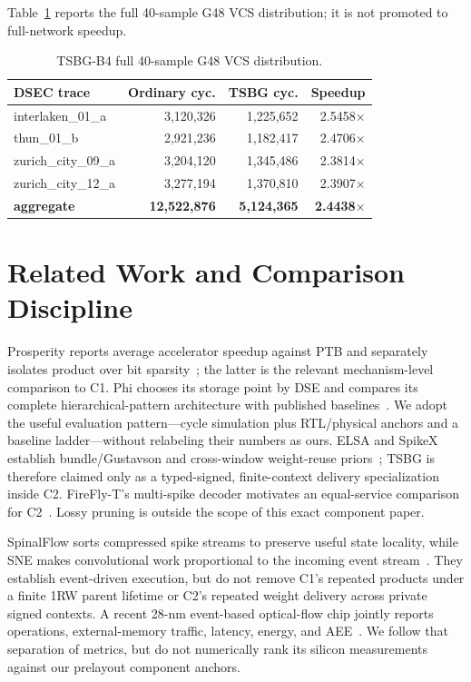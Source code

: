 \documentclass[conference]{IEEEtran}
\begin{document}
Table~\ref{tab:tsbgseq} reports the full 40-sample G48 VCS distribution; it is
not promoted to full-network speedup.

\begin{table}[t]
\caption{TSBG-B4 full 40-sample G48 VCS distribution.}
\label{tab:tsbgseq}
\centering
\scriptsize
\begin{tabular}{@{}lrrr@{}}
\toprule
DSEC trace & Ordinary cyc. & TSBG cyc. & Speedup \\
\midrule
interlaken\_01\_a & 3,120,326 & 1,225,652 & 2.5458$\times$ \\
thun\_01\_b & 2,921,236 & 1,182,417 & 2.4706$\times$ \\
zurich\_city\_09\_a & 3,204,120 & 1,345,486 & 2.3814$\times$ \\
zurich\_city\_12\_a & 3,277,194 & 1,370,810 & 2.3907$\times$ \\
\textbf{aggregate} & \textbf{12,522,876} & \textbf{5,124,365} & \textbf{2.4438$\times$} \\
\bottomrule
\end{tabular}
\end{table}

\section{Related Work and Comparison Discipline}
Prosperity reports average accelerator speedup against PTB and separately
isolates product over bit sparsity~\cite{prosperity}; the latter is the relevant
mechanism-level comparison to C1.  Phi chooses its storage point by DSE and
compares its complete hierarchical-pattern architecture with published
baselines~\cite{phi}.  We adopt the useful evaluation pattern---cycle simulation
plus RTL/physical anchors and a baseline ladder---without relabeling their
numbers as ours.  ELSA and SpikeX establish bundle/Gustavson and cross-window
weight-reuse priors~\cite{elsa,spikex}; TSBG is therefore claimed only as a
typed-signed, finite-context delivery specialization inside C2.  FireFly-T's
multi-spike decoder motivates an equal-service comparison for
C2~\cite{fireflyt}.  Lossy pruning is outside the scope of this exact
component paper.

SpinalFlow sorts compressed spike streams to preserve useful state locality,
while SNE makes convolutional work proportional to the incoming event
stream~\cite{spinalflow,sne}.  They establish event-driven execution, but do not
remove C1's repeated products under a finite 1RW parent lifetime or C2's repeated
weight delivery across private signed contexts.  A recent 28-nm event-based
optical-flow chip jointly reports operations, external-memory traffic, latency,
energy, and AEE~\cite{ciccflow}.  We follow that separation of metrics, but do
not numerically rank its silicon measurements against our prelayout component
anchors.
\end{document}
